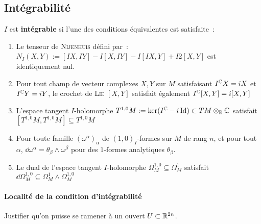 \documentclass[a4paper,draft]{amsart}
\begin{document}
\subsection{Intégrabilité \label{integrabilite}}\cite{Godbillon1969,Voisin2002}
$I$ est \textbf{intégrable} si l'une des conditions équivalentes est satisfaite~:
\begin{enumerate}[($i$)]
\item Le tenseur de \textsc{Nijenhuis} défini par~: $N_I(X,Y) := [ I X , I Y ] - I [ X , I Y ] - I [ I X , Y ] + I 2 [ X , Y ]$ est identiquement nul.
\item Pour tout champ de vecteur complexes $X,Y$ sur $M$ satisfaisant $I^{\mathbb{C}} X=iX$ et $I^{\mathbb{C}} Y=iY$, le crochet de \textsc{Lie} $[X,Y]$ satisfait également $I^{\mathbb{C}}[X,Y] = i[X,Y]$
\item L'espace tangent $I$-holomorphe $T^{1,0}M := \ker(I^{\mathbb{C}} -  i\operatorname{Id}) \subset TM \otimes_{\mathbb{R}} \mathbb{C}$ satisfait $[T^{1,0}M,T^{1,0}M] \subseteq T^{1,0}M$
\item Pour toute famille $(\omega^\alpha)_\alpha$ de $(1,0)_I$-formes sur $M$ de rang $n$, et pour tout $\alpha$, $\dd \omega^\alpha = \theta_\beta \wedge \omega^\beta$ pour des $1$-formes analytiques $\theta_\beta$.
\item Le dual de l'espace tangent $I$-holomorphe $\Omega^{1,0}_M \subseteq \Omega^1_M$ satisfait $\dd \Omega^{1,0}_M \subseteq \Omega^1_M \wedge \Omega^{1,0}_M$
\end{enumerate}

\paragraph{Localité de la condition d'intégrabilité}
Justifier qu'on puisse se ramener à un ouvert $U \subset \mathbb{R}^{2n}$.
\end{document}

